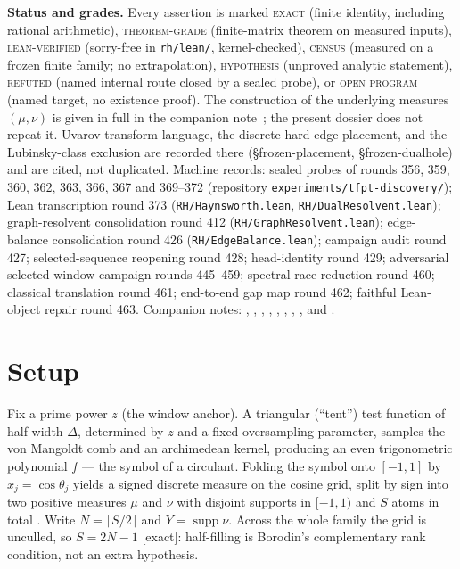 \documentclass[11pt]{article}
\theoremstyle{remark}
\newcommand{\gr}[1]{\textnormal{\small[#1]}}
\begin{document}
\medskip\noindent
\textbf{Status and grades.}\enspace
Every assertion is marked
\textsc{exact} (finite identity, including rational arithmetic),
\textsc{theorem-grade} (finite-matrix theorem on measured inputs),
\textsc{lean-verified} (sorry-free in \texttt{rh/lean/}, kernel-checked),
\textsc{census} (measured on a frozen finite family; no
extrapolation),
\textsc{hypothesis} (unproved analytic statement),
\textsc{refuted} (named internal route closed by a sealed probe),
or \textsc{open program} (named target, no existence proof).
The construction of the underlying measures $(\mu,\nu)$ is given in
full in the companion note~\cite{lstar-note}; the present dossier
does not repeat it.  Uvarov-transform language, the discrete-hard-edge
placement, and the Lubinsky-class exclusion are recorded there
(\S{}frozen-placement, \S{}frozen-dualhole) and are cited, not
duplicated.  Machine records: sealed probes of rounds
356, 359, 360, 362, 363, 366, 367 and 369--372 (repository
\texttt{experiments/tfpt-discovery/}); Lean transcription round 373
(\texttt{RH/Haynsworth.lean}, \texttt{RH/DualResolvent.lean});
graph-resolvent consolidation round 412
(\texttt{RH/GraphResolvent.lean});
edge-balance consolidation round 426
(\texttt{RH/EdgeBalance.lean});
campaign audit round 427; selected-sequence reopening round 428;
head-identity round 429; adversarial selected-window campaign
rounds 445--459; spectral race reduction round 460; classical
translation round 461; end-to-end gap map round 462; faithful
Lean-object repair round 463.  Companion notes:
, ,
, ,
, ,
, ,
and .

\section{Setup}\label{sec:setup}

Fix a prime power $z$ (the window anchor).  A triangular (``tent'')
test function of half-width $\Delta$, determined by $z$ and a fixed
oversampling parameter, samples the von Mangoldt comb and an
archimedean kernel, producing an even trigonometric polynomial
$f$ --- the symbol of a circulant.  Folding the symbol onto $[-1,1]$
by $x_{j}=\cos\theta_{j}$ yields a signed discrete measure on the
cosine grid, split by sign into two positive measures $\mu$ and
$\nu$ with disjoint supports in $[-1,1)$ and $S$ atoms in total
\cite[construction]{lstar-note}.  Write $N=\lceil S/2\rceil$ and
$Y=\operatorname{supp}\nu$.  Across the whole family the grid is
unculled, so $S=2N-1$ \gr{exact}: half-filling is Borodin's
complementary rank condition, not an extra hypothesis.
\end{document}
